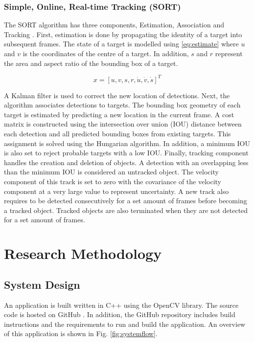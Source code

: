 \documentclass[12pt,a4paper,fleqn]{report}
\begin{document}

\subsection{Simple, Online, Real-time Tracking (SORT)}
The SORT algorithm has three components, Estimation, Association and Tracking \cite{sort:2016}.
First, estimation is done by propagating the identity of a target into subsequent frames. 
The state of a target is modelled using \ref{eq:estimate} where $u$ and $v$ is the coordinates of
the centre of a target.
In addition, $s$ and $r$ represent the area and aspect ratio of the bounding box of a target.

\begin{equation}
    x = [ u, v, s, r, \dot{u}, \dot{v}, \dot{s}] ^ T
    \label{eq:estimate}
\end{equation}

A Kalman filter is used to correct the new location of detections.
Next, the algorithm associates detections to targets.
The bounding box geometry of each target is estimated by predicting a new location in the current
frame.
A cost matrix is constructed using the intersection over union (IOU) distance between each detection
and all predicted bounding boxes from existing targets.
This assignment is solved using the Hungarian algorithm.
In addition, a minimum IOU is also set to reject probable targets with a low IOU.
Finally, tracking component handles the creation and deletion of objects.
A detection with an overlapping less than the minimum IOU is considered an untracked object.
The velocity component of this track is set to zero with the covariance of the velocity component at
a very large value to represent uncertainty. 
A new track also requires to be detected consecutively for a set amount of frames before becoming a tracked
object.
Tracked objects are also terminated when they are not detected for a set amount of frames.


\chapter{Research Methodology}

\section{System Design}
An application is built written in C++ using the OpenCV library.
The source code is hosted on GitHub \cite{rvc-source:2022}. 
In addition, the GitHub repository includes build instructions and the requirements to run and build the
application. 
An overview of this application is shown in Fig. \ref{fig:systemflow}.
\end{document}
